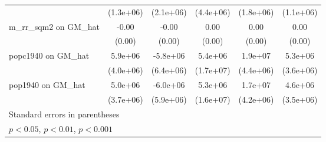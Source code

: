 \begin{table}[htbp]
\begin{tabular}{l*{5}{c}}
                &(1.3e+06)         &(2.1e+06)         &(4.4e+06)         &(1.8e+06)         &(1.1e+06)         \\
\addlinespace
m\_rr\_sqm2 on GM\_hat&    -0.00         &    -0.00         &     0.00         &     0.00         &     0.00         \\
                &   (0.00)         &   (0.00)         &   (0.00)         &   (0.00)         &   (0.00)         \\
\addlinespace
popc1940 on GM\_hat&  5.9e+06         & -5.8e+06         &  5.4e+06         &  1.9e+07\sym{***}&  5.3e+06         \\
                &(4.0e+06)         &(6.4e+06)         &(1.7e+07)         &(4.4e+06)         &(3.6e+06)         \\
\addlinespace
pop1940 on GM\_hat&  5.0e+06         & -6.0e+06         &  5.3e+06         &  1.7e+07\sym{***}&  4.6e+06         \\
                &(3.7e+06)         &(5.9e+06)         &(1.6e+07)         &(4.2e+06)         &(3.5e+06)         \\
\bottomrule
\multicolumn{6}{l}{\footnotesize Standard errors in parentheses}\\
\multicolumn{6}{l}{\footnotesize \sym{*} \(p<0.05\), \sym{**} \(p<0.01\), \sym{***} \(p<0.001\)}\\
\end{tabular}
\end{table}
